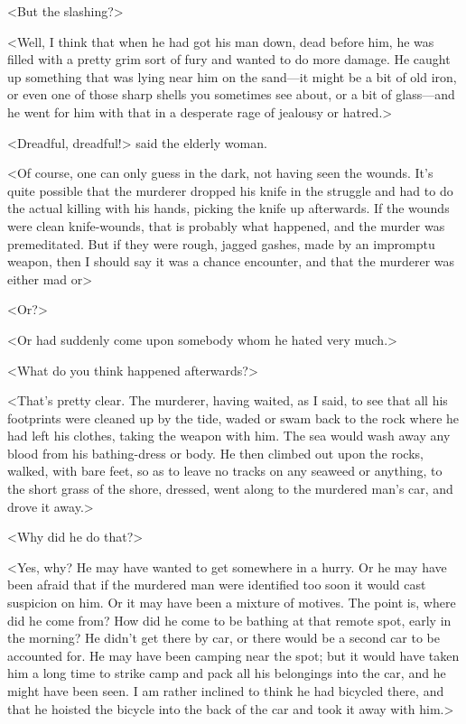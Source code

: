 <But the slashing?>

<Well, I think that when he had got his man down, dead before him, he was filled with a pretty grim sort of fury and wanted to do more damage. He caught up something that was lying near him on the sand—it might be a bit of old iron, or even one of those sharp shells you sometimes see about, or a bit of glass—and he went for him with that in a desperate rage of jealousy or hatred.>

<Dreadful, dreadful!> said the elderly woman.

<Of course, one can only guess in the dark, not having seen the wounds. It's quite possible that the murderer dropped his knife in the struggle and had to do the actual killing with his hands, picking the knife up afterwards. If the wounds were clean knife-wounds, that is probably what happened, and the murder was premeditated. But if they were rough, jagged gashes, made by an impromptu weapon, then I should say it was a chance encounter, and that the murderer was either mad or\longdash>

<Or?>

<Or had suddenly come upon somebody whom he hated very much.>

<What do you think happened afterwards?>

<That's pretty clear. The murderer, having waited, as I said, to see that all his footprints were cleaned up by the tide, waded or swam back to the rock where he had left his clothes, taking the weapon with him. The sea would wash away any blood from his bathing-dress or body. He then climbed out upon the rocks, walked, with bare feet, so as to leave no tracks on any seaweed or anything, to the short grass of the shore, dressed, went along to the murdered man's car, and drove it away.>

<Why did he do that?>

<Yes, why? He may have wanted to get somewhere in a hurry. Or he may have been afraid that if the murdered man were identified too soon it would cast suspicion on him. Or it may have been a mixture of motives. The point is, where did he come from? How did he come to be bathing at that remote spot, early in the morning? He didn't get there by car, or there would be a second car to be accounted for. He may have been camping near the spot; but it would have taken him a long time to strike camp and pack all his belongings into the car, and he might have been seen. I am rather inclined to think he had bicycled there, and that he hoisted the bicycle into the back of the car and took it away with him.>

